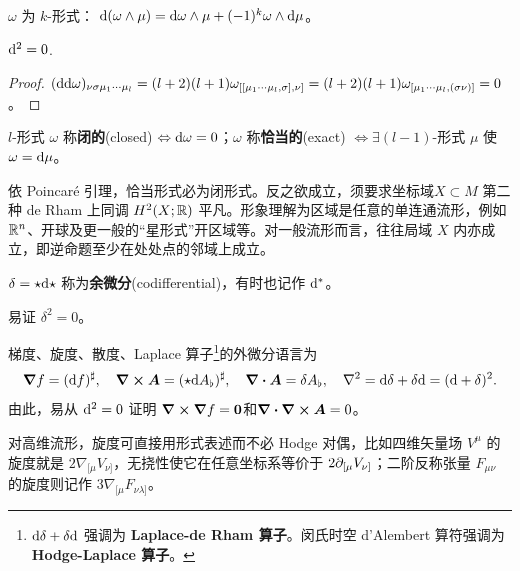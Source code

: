 \begin{theorem}[Leibniz 律]$\omega$ 为 $k$-形式：
    $\dd(\omega\wedge\mu)=\dd\omega\wedge\mu+(-1)^k\omega\wedge\dd\mu$。
\end{theorem}

\begin{theorem}[Poincaré 引理] $\dd^2=0$.
\end{theorem}
\begin{proof} $(\dd\dd\omega)_{\nu\sigma\mu_1\cdots\mu_l}=(l+2)(l+1)\omega_{[[\mu_1\cdots\mu_l,\sigma],\nu]}=(l+2)(l+1)\omega_{[\mu_1\cdots\mu_l,(\sigma\nu)]}=0$。
\end{proof}

\begin{definition}
    $l$-形式 $\omega$ 称\textbf{闭的}(closed) $\Leftrightarrow\dd\omega=0$；$\omega$ 称\textbf{恰当的}(exact) $\Leftrightarrow \exists (l-1)$-形式 $\mu$ 使 $\omega=\dd\mu$。
\end{definition}
依 Poincaré 引理，恰当形式必为闭形式。反之欲成立，须要求坐标域$X\subset M$ 第二种 de Rham 上同调 $H^{2}(X;\mathbb{R})$ 平凡。形象理解为区域是任意的单连通流形，例如 $\mathbb{R}^{n}$、开球及更一般的“星形式”开区域等。对一般流形而言，往往局域 $X$ 内亦成立，即逆命题至少在处处点的邻域上成立。

\begin{definition}
    $\delta={\star\dd\star}$ 称为\textbf{余微分}(codifferential)，有时也记作 $\dd^*$。
\end{definition}
\begin{theorem}
    易证 $\delta^2=0$。
\end{theorem}

\begin{example}[矢量分析]
    梯度、旋度、散度、Laplace 算子\footnote{$\dd \delta+\delta \dd$ 强调为 \textbf{Laplace-de Rham 算子}。闵氏时空 d'Alembert 算符强调为 \textbf{Hodge-Laplace 算子}。}的外微分语言为
    \[\grad f=(\dd f)^\sharp,\quad
    \curl\bm A=({\star\dd} A_\flat)^\sharp,\quad
    \div\bm A=\delta A_\flat,\quad
    \nabla^2=\dd \delta+\delta \dd=(\dd+\delta)^2.\]
    由此，易从 $\dd^2=0$ 证明 $\curl\grad f=\bm 0$和$\div\curl\bm A=0$。
    
    对高维流形，旋度可直接用形式表述而不必 Hodge 对偶，比如四维矢量场 $V^\mu$ 的旋度就是 $2\nabla_{[\mu} V_{\nu]}$，无挠性使它在任意坐标系等价于 $2\partial_{[\mu} V_{\nu]}$；二阶反称张量 $F_{\mu\nu}$ 的旋度则记作 $3\nabla_{[\mu}F_{\nu\lambda]}$。
\end{example}

